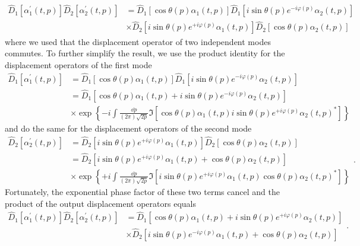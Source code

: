 \begin{equation}
	\begin{split}
		\hat{D}_1\left[\alpha_1^\prime(t,p)\right]
		\hat{D}_2\left[\alpha_2^\prime(t,p)\right]
		&=
		\hat{D}_1\left[\cos\theta(p)\alpha_1(t,p)\right]
		\hat{D}_1\left[i\sin\theta(p)e^{-i\varphi(p)}\alpha_2(t,p)\right]
		\\
		&\times
		\hat{D}_2\left[i\sin\theta(p)e^{+i\varphi(p)}\alpha_1(t,p)\right]
		\hat{D}_2\left[\cos\theta(p)\alpha_2(t,p)\right]
	\end{split}
\end{equation}
where we used that the displacement operator of two independent modes commutes.
To further simplify the result, we use the product identity for the displacement operators of the first mode
\begin{equation}
	\begin{split}
		\hat{D}_1\left[\alpha_1^\prime(t,p)\right]
		&=
		\hat{D}_1\left[\cos\theta(p)\alpha_1(t,p)\right]
		\hat{D}_1\left[i\sin\theta(p)e^{-i\varphi(p)}\alpha_2(t,p)\right]
		\\
		&=
		\hat{D}_1\left[\cos\theta(p)\alpha_1(t,p)+i\sin\theta(p)e^{-i\varphi(p)}\alpha_2(t,p)\right]
		\\
		&\times
		\exp\left\{
			-i\int\frac{\dd{p}}{(2\pi)\sqrt{2p}}
			\Im[
				\cos\theta(p)\alpha_1(t,p)
				i\sin\theta(p)e^{+i\varphi(p)}\alpha_2(t,p)^*
			]
		\right\}
	\end{split}
\end{equation}
and do the same for the displacement operators of the second mode
\begin{equation}
	\begin{split}
		\hat{D}_2\left[\alpha_2^\prime(t,p)\right]
		&=
		\hat{D}_2\left[i\sin\theta(p)e^{+i\varphi(p)}\alpha_1(t,p)\right]
		\hat{D}_2\left[\cos\theta(p)\alpha_2(t,p)\right]
		\\
		&=
		\hat{D}_2\left[i\sin\theta(p)e^{+i\varphi(p)}\alpha_1(t,p)+\cos\theta(p)\alpha_2(t,p)\right]
		\\
		&\times
		\exp\left\{
			+i\int\frac{\dd{p}}{(2\pi)\sqrt{2p}}
			\Im[
				i\sin\theta(p)e^{+i\varphi(p)}\alpha_1(t,p)
				\cos\theta(p)\alpha_2(t,p)^*
			]
		\right\}
	\end{split}
	.
\end{equation}
Fortunately, the exponential phase factor of these two terms cancel and the product of the output displacement operators equals
\begin{equation}
	\begin{split}
		\hat{D}_1\left[\alpha_1^\prime(t,p)\right]
		\hat{D}_2\left[\alpha_2^\prime(t,p)\right]
		&=
		\hat{D}_1\left[\cos\theta(p)\alpha_1(t,p)+i\sin\theta(p)e^{+i\varphi(p)}\alpha_2(t,p)\right]
		\\
		&\times
		\hat{D}_2\left[i\sin\theta(p)e^{-i\varphi(p)}\alpha_1(t,p)+\cos\theta(p)\alpha_2(t,p)\right]
	\end{split}
	.
\end{equation}
